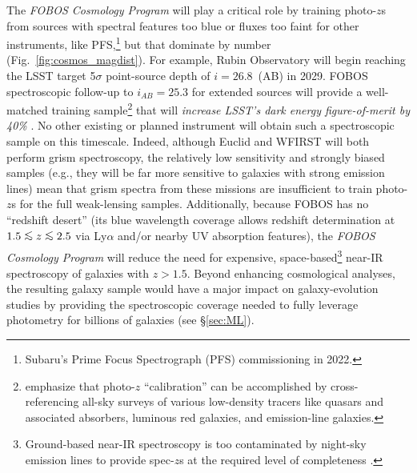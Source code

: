 \documentclass[oneside,11pt]{amsart}
\DeclareRobustCommand{\lesssim}{%
\mathrel{\hskip-.5em\begin{array}{c}<\\[-8pt]\sim\end{array}\hskip-.5em}}
\begin{document}
The {\it FOBOS Cosmology Program} will play a critical role by training photo-$z$s from sources with spectral features too blue or fluxes too faint for other instruments, like PFS,\footnote{Subaru's Prime Focus Spectrograph (PFS) commissioning in 2022.} but that dominate by number (Fig.~\ref{fig:cosmos_magdist}).  For example, Rubin Observatory will begin reaching the LSST target 5$\sigma$ point-source depth of $i = 26.8$~(AB) in 2029.   FOBOS spectroscopic follow-up to $i_{AB} = 25.3$ for extended sources will provide a well-matched training sample\footnote{\citet{newman15} emphasize that photo-$z$ ``calibration'' can be accomplished by cross-referencing all-sky surveys of various low-density tracers like quasars and associated absorbers, luminous red galaxies, and emission-line galaxies.} that will \emph{increase LSST's dark energy figure-of-merit by 40\%} \citep{newman15}. No other existing or planned instrument will obtain such a spectroscopic sample on this timescale.  Indeed, although Euclid and WFIRST will both perform grism spectroscopy, the relatively low sensitivity and strongly biased samples (e.g., they will be far more sensitive to galaxies with strong emission lines) mean that grism spectra from these missions are insufficient to train photo-$z$s for the full weak-lensing samples.  Additionally, because FOBOS has no ``redshift desert'' (its blue wavelength coverage allows redshift determination at $1.5\lesssim z \lesssim2.5$ via Ly$\alpha$ and/or nearby UV absorption features), the {\it FOBOS Cosmology Program} will reduce the need for expensive, space-based\footnote{Ground-based near-IR spectroscopy is too contaminated by night-sky emission lines to provide spec-$z$s at the required level of completeness \citep{newman15}.} near-IR spectroscopy of galaxies with $z > 1.5$.  Beyond enhancing cosmological analyses, the resulting galaxy sample would have a major impact on galaxy-evolution studies by providing the spectroscopic coverage needed to fully leverage photometry for billions of galaxies (see \S\ref{sec:ML}). 

\end{document}
